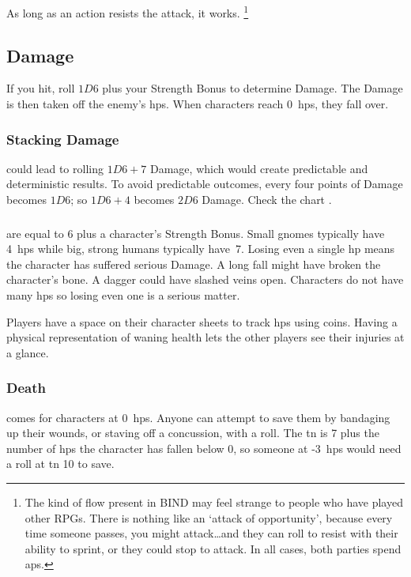 \begin{multicols}{2}
As long as an action resists the attack, it works.%
\footnote{The kind of flow present in BIND may feel strange to people who have played other RPGs.
There is nothing like an `attack of opportunity', because every time someone passes, you might attack\ldots and they can roll to resist with their ability to sprint, or they could stop to attack.
In all cases, both parties spend \glspl{ap}.}

\begin{figure*}[t!]
  \label{stackingDamageChart}%
  \stackingDamageChart
\end{figure*}

\subsection{Damage}

If you hit, roll $1D6$ plus your Strength Bonus to determine Damage.
The Damage is then taken off the enemy's \glspl{hp}.
When characters reach 0~\glspl{hp}, they fall over.

\subsubsection{Stacking Damage}
\label{stackingDamage}
could lead to rolling $1D6+7$ Damage, which would create predictable and deterministic results.
To avoid predictable outcomes, every four points of Damage becomes $1D6$;
so $1D6 + 4$ becomes $2D6$ Damage.
Check the chart .

\subsubsection{}
are equal to 6 plus a character's Strength Bonus.
Small gnomes typically have 4~\glspl{hp} while big, strong humans typically have~7.
Losing even a single \gls{hp} means the character has suffered serious Damage.
A long fall might have broken the character's bone.
A dagger could have slashed veins open.
Characters do not have many \glspl{hp} so losing even one is a serious matter.

Players have a space on their character sheets to track \glspl{hp} using coins.
Having a physical representation of waning health lets the other players see their injuries at a glance.

\subsubsection{Death}
\label{death}
comes for characters at 0~\glspl{hp}.
Anyone can attempt to save them by bandaging up their wounds, or staving off a concussion, with a  roll.
The \gls{tn} is 7 plus the number of \glspl{hp} the character has fallen below 0, so someone at -3~\glspl{hp} would need a roll at \gls{tn} 10 to save.


\end{multicols}
